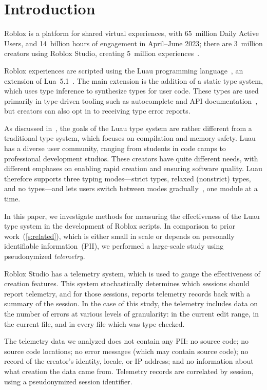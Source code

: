 \documentclass[english,submission,cleveref]{programming}
\begin{document}
\section{Introduction}
\label{s:introduction}

{Roblox} is a platform for {shared virtual experiences}, with
65~million Daily Active Users, and 14~billion hours of engagement in
April--June 2023; there are 3~million creators using {Roblox Studio},
creating 5~million experiences~\cite{corp.roblox.com}.

{Roblox experiences} are scripted using the 
{Luau} programming language~\cite{luau-lang.org},
an extension of {Lua~5.1~\cite{lua}}.
The main extension is the addition of a static type system, which uses
type inference to synthesize types for user code. These types
are used primarily in type-driven tooling such as autocomplete
and API documentation~\cite{luau-autocomplete},
but creators can also opt in to receiving type error reports.

As discussed in~\cite{bfj-hatra-2021},
the goals of the {Luau} type system are rather different from
a traditional type system, which focuses on compilation and memory safety.
{Luau} has a diverse user community, ranging from
students in code camps to professional development studios. These
creators have quite different needs, with different emphases on
enabling rapid creation and ensuring software quality.
{Luau} therefore supports three typing modes---strict types,
relaxed (nonstrict) types, and no types---and lets users switch
between modes gradually~\cite{st-sfp-2006,tfffgksst-snapl-2017}, one module at a time.

In this paper, we investigate methods for measuring the effectiveness
of the {Luau} type system in the development of {Roblox} scripts.
In comparison to prior work~(\cref{s:related}), which is either small in scale
or depends on personally identifiable information~(PII),
we performed a large-scale study using pseudonymized \emph{telemetry}.

{Roblox Studio} has a telemetry system, which is used to gauge
the effectiveness of creation features. This system stochastically
determines which sessions should report telemetry, and for those
sessions, reports telemetry records back with a summary of the
session. In the case of this study, the telemetry includes data on the
number of errors at various levels of granularity: in the current edit
range, in the current file, and in every file which was type
checked.

The telemetry data we analyzed does not contain any PII:
no source code;
no source code locations;
no error messages (which may contain source code);
no record of the creator's identity, locale, or IP address;
and no information about what creation the data came from.
Telemetry records are correlated by session, using a pseudonymized
session identifier.
\end{document}
